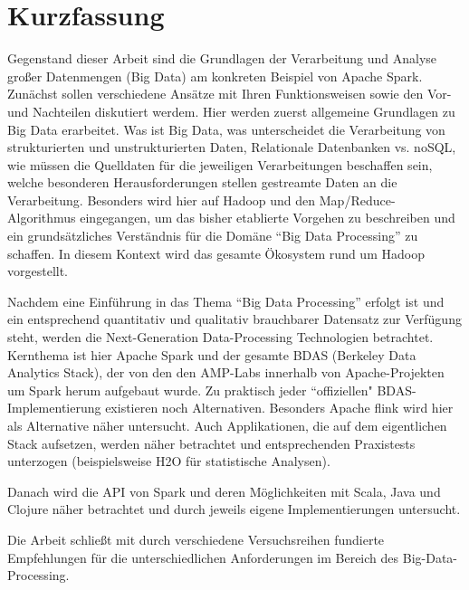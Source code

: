 

\section*{Kurzfassung}
Gegenstand dieser Arbeit sind die Grundlagen der Verarbeitung und Analyse großer Datenmengen (Big Data) am konkreten Beispiel von Apache Spark. Zunächst sollen verschiedene Ansätze mit Ihren Funktionsweisen sowie den Vor- und Nachteilen diskutiert werdem. Hier werden zuerst allgemeine Grundlagen zu Big Data erarbeitet. Was ist Big Data, was unterscheidet die Verarbeitung von strukturierten und unstrukturierten Daten, Relationale Datenbanken vs. noSQL, wie müssen die Quelldaten für die jeweiligen Verarbeitungen beschaffen sein, welche besonderen Herausforderungen stellen gestreamte Daten an die Verarbeitung. Besonders wird hier auf Hadoop und den Map/Reduce-Algorithmus eingegangen, um das bisher etablierte Vorgehen zu beschreiben und ein grundsätzliches Verständnis für die Domäne ``Big Data Processing'' zu schaffen. In diesem Kontext wird das gesamte Ökosystem rund um Hadoop vorgestellt. 

Nachdem eine Einführung in das Thema ``Big Data Processing'' erfolgt ist und ein entsprechend quantitativ und qualitativ brauchbarer Datensatz zur Verfügung steht, werden die Next-Generation Data-Processing Technologien betrachtet. Kernthema ist hier Apache Spark und der gesamte BDAS (Berkeley Data Analytics Stack), der von den den AMP-Labs innerhalb von Apache-Projekten um Spark herum aufgebaut wurde. Zu praktisch jeder ``offiziellen" BDAS-Implementierung existieren noch Alternativen. Besonders Apache flink wird hier als Alternative näher untersucht. Auch Applikationen, die auf dem eigentlichen Stack aufsetzen, werden näher betrachtet und entsprechenden Praxistests unterzogen (beispielsweise H2O für statistische Analysen). 

Danach wird die API von Spark und deren Möglichkeiten mit Scala, Java und Clojure näher betrachtet und durch jeweils eigene Implementierungen untersucht. 

Die Arbeit schließt mit durch verschiedene Versuchsreihen fundierte Empfehlungen für die unterschiedlichen Anforderungen im Bereich des Big-Data-Processing.




